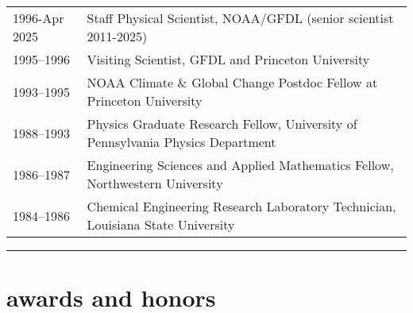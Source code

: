 \documentclass{article}
\begin{document}
\begin{tabular}{ll}
  1996-Apr 2025   &  Staff Physical Scientist, NOAA/GFDL (senior scientist 2011-2025)  \\  
  
  1995--1996     &  Visiting Scientist, GFDL and Princeton University  \\ 
  
  1993--1995     & NOAA Climate \& Global Change Postdoc Fellow at Princeton University \\
  
  1988--1993     &  Physics Graduate Research Fellow, University of Pennsylvania Physics Department  \\                     
  
  1986--1987     &  Engineering Sciences and Applied Mathematics Fellow, Northwestern University \\
  
  1984--1986     &  Chemical Engineering Research Laboratory Technician, Louisiana State University

\end{tabular}


\noindent\rule{\textwidth}{1pt}
\vspace{-.5cm}
\section*{\sc  \color{Maroon}   awards and honors}
\vspace{-.25cm}
\end{document}
